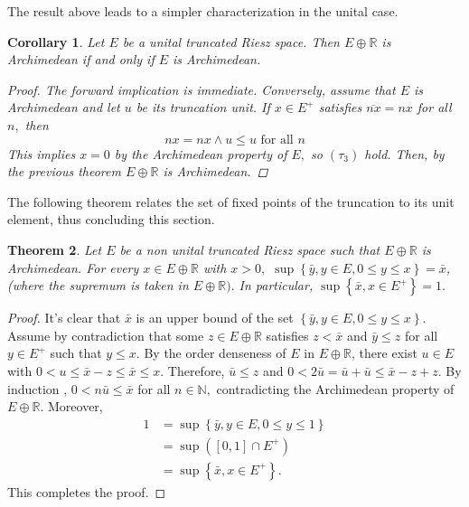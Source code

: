 \documentclass{birkau}
\numberwithin{equation}{section}
\theoremstyle{plain}
\newtheorem{theorem}{Theorem}[section]
\newtheorem{corollary}[theorem]{Corollary}
\theoremstyle{definition}
\begin{document}
The result above leads to a simpler characterization in the unital case.
\begin{corollary}
	Let $E$ be a unital truncated Riesz space. Then $E\oplus\mathbb{R}$ is
	Archimedean if and only if $E$ is Archimedean.
	\begin{proof}
		The forward implication is immediate. Conversely, assume that $E$ is
		Archimedean and let $u$ be its truncation unit. If $x\in E^{+}$ satisfies
		$\overline{nx}=nx$ for all $n,$ then%
		\[
		nx=nx\wedge u\leq u\text{ for all }n
		\]
		This implies $x=0$ by the Archimedean property of $E,$ so $\left(  \tau
		_{3}\right)  $ hold. Then, by the previous theorem $E\oplus\mathbb{R}$ is
		Archimedean. 
	\end{proof}
\end{corollary}
The following theorem relates the set of fixed points of the truncation to its
unit element, thus concluding this section.
\begin{theorem}
	Let $E$ be a non unital truncated Riesz space such that $E\oplus%
	\mathbb{R}
	$ is Archimedean.
	For every $x\in E\oplus%
	\mathbb{R}
	$ with $x>0,$ $\sup\left\{  \bar{y},y\in E,0\leq y\leq x\right\}  =\bar{x}$,
	(where the supremum is taken in $E\oplus%
	\mathbb{R}
	).$ In particular,  $\sup\left\{  \bar{x},x\in E^{+}\right\}  =1.$
\end{theorem}
\begin{proof}
	It's clear that $\bar{x}$ is an upper bound of the set $\left\{  \bar{y},y\in
	E,0\leq y\leq x\right\}  .$ Assume by contradiction that some $z\in E\oplus%
	\mathbb{R}
	$ satisfies $z<\bar{x}$ and $\bar{y}\leq z$ for all $y\in E^{+}$ such that
	$y\leq x.$ By the order denseness of $E$ in $E\oplus%
	\mathbb{R}
	$, there exist $u\in E$ with $0<u\leq\bar{x}-z\leq\bar{x}\leq x.$ Therefore,
	$\bar{u}\leq z$ and $0<2\bar{u}=\bar{u}+\bar{u}\leq\bar{x}-z+z.$ By induction
	, $0<n\bar{u}\leq\bar{x}$ for all $n\in%
	\mathbb{N}
	,$ contradicting the Archimedean property of $E\oplus%
	\mathbb{R}
	.$
	Moreover,%
	\begin{align*}
		1  & =\sup\left\{  \bar{y},y\in E,0\leq y\leq1\right\}  \\
		& =\sup\left(  \left[  0,1\right]  \cap E^{+}\right)  \\
		& =\sup\left\{  \bar{x},x\in E^{+}\right\}  .
	\end{align*}
	This completes the proof.
\end{proof}
\end{document}
